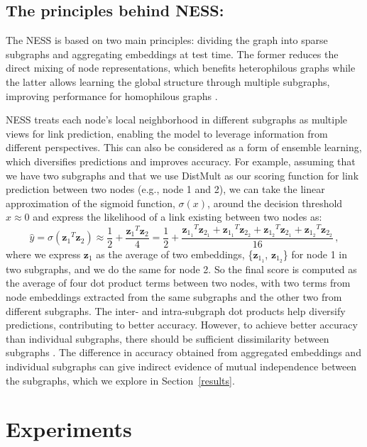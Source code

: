 \documentclass{article}
\begin{document}
\subsection{The principles behind NESS:}\label{ness_principles}
The NESS is based on two main principles: dividing the graph into sparse subgraphs and aggregating embeddings at test time. The former reduces the direct mixing of node representations, which benefits heterophilous graphs while the latter allows learning the global structure through multiple subgraphs, improving performance for homophilous graphs \citep{zhu2020beyond}.


NESS treats each node's local neighborhood in different subgraphs as multiple views for link prediction, enabling the model to leverage information from different perspectives. This can also be considered as a form of ensemble learning, which diversifies predictions and improves accuracy. For example, assuming that we have two subgraphs and that we use DistMult \citep{yang2014embedding} as our scoring function for link prediction between two nodes (e.g., node 1 and 2), we can take the linear approximation of the sigmoid function, $\sigma(x)$, around the decision threshold $x\approx0$ and express the likelihood of a link existing between two nodes as:
\begin{equation}
\hat{y}=\sigma({\bm{z}_1}^T{\bm{z}_2}) \approx \frac{1}{2} + \frac{{\bm{z}_1}^T{\bm{z}_2}}{4} = \frac{1}{2} + \frac{{\bm{z}_{1_1}}^T\bm{z}_{2_1}+{\bm{z}_{1_1}}^T\bm{z}_{2_2}+{\bm{z}_{1_2}}^T\bm{z}_{2_1}+{\bm{z}_{1_2}}^T\bm{z}_{2_2}}{16}\,,
\end{equation}
where we express $\bm{z}_1$ as the average of two embeddings, \{$\bm{z}_{1_1}$, $\bm{z}_{1_2}$\} for node 1 in two subgraphs, and we do the same for node 2. So the final score is computed as the average of four dot product terms between two nodes, with two terms from node embeddings extracted from the same subgraphs and the other two from different subgraphs. The inter- and intra-subgraph dot products help diversify predictions, contributing to better accuracy. However, to achieve better accuracy than individual subgraphs, there should be sufficient dissimilarity between subgraphs \citep{ho1998random}. The difference in accuracy obtained from aggregated embeddings and individual subgraphs can give indirect evidence of mutual independence between the subgraphs, which we explore in Section~\ref{results}.


\section{Experiments}\label{exp_setup}
\end{document}
